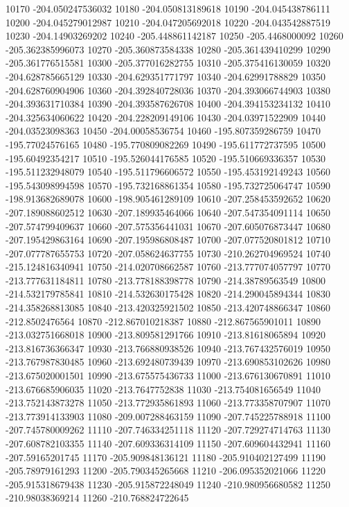 {10170 -204.050247536032
10180 -204.050813189618
10190 -204.045438786111
10200 -204.045279012987
10210 -204.047205692018
10220 -204.043542887519
10230 -204.14903269202
10240 -205.448861142187
10250 -205.4468000092
10260 -205.362385996073
10270 -205.360873584338
10280 -205.361439410299
10290 -205.361776515581
10300 -205.377016282755
10310 -205.375416130059
10320 -204.628785665129
10330 -204.629351771797
10340 -204.62991788829
10350 -204.628760904906
10360 -204.392840728036
10370 -204.393066744903
10380 -204.393631710384
10390 -204.393587626708
10400 -204.394153234132
10410 -204.325634060622
10420 -204.228209149106
10430 -204.03971522909
10440 -204.03523098363
10450 -204.00058536754
10460 -195.807359286759
10470 -195.77024576165
10480 -195.770809082269
10490 -195.611772737595
10500 -195.60492354217
10510 -195.526044176585
10520 -195.510669336357
10530 -195.511232948079
10540 -195.511796606572
10550 -195.453192149243
10560 -195.543098994598
10570 -195.732168861354
10580 -195.732725064747
10590 -198.913682689078
10600 -198.905461289109
10610 -207.258453592652
10620 -207.189088602512
10630 -207.189935464066
10640 -207.547354091114
10650 -207.574799409637
10660 -207.575356441031
10670 -207.605076873447
10680 -207.195429863164
10690 -207.195986808487
10700 -207.077520801812
10710 -207.077787655753
10720 -207.058624637755
10730 -210.262704969524
10740 -215.124816340941
10750 -214.020708662587
10760 -213.777074057797
10770 -213.777631184811
10780 -213.778188398778
10790 -214.38789563549
10800 -214.532179785841
10810 -214.532630175428
10820 -214.290045894344
10830 -214.358268813085
10840 -213.420325921502
10850 -213.420748866347
10860 -212.8502476564
10870 -212.867010218387
10880 -212.867565901011
10890 -213.032751668018
10900 -213.809581291766
10910 -213.81618065894
10920 -213.816736366347
10930 -213.766880938526
10940 -213.767432576019
10950 -213.767987830485
10960 -213.692480739439
10970 -213.690853102626
10980 -213.675020001501
10990 -213.675575436733
11000 -213.676130670891
11010 -213.676685906035
11020 -213.7647752838
11030 -213.754081656549
11040 -213.752143873278
11050 -213.772935861893
11060 -213.773358707907
11070 -213.773914133903
11080 -209.007288463159
11090 -207.745225788918
11100 -207.745780009262
11110 -207.746334251118
11120 -207.729274714763
11130 -207.608782103355
11140 -207.609336314109
11150 -207.609604432941
11160 -207.59165201745
11170 -205.909848136121
11180 -205.910402127499
11190 -205.78979161293
11200 -205.790345265668
11210 -206.095352021066
11220 -205.915318679438
11230 -205.915872248049
11240 -210.980956680582
11250 -210.98038369214
11260 -210.768824722645
}
